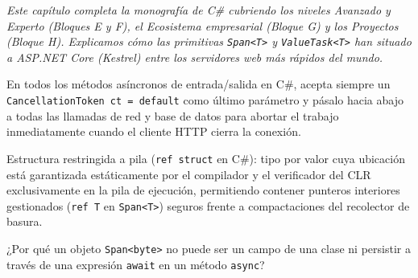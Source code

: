 \documentclass{book}
\begin{document}
\noindent\textit{Este capítulo completa la monografía de C\# cubriendo los niveles Avanzado y Experto (Bloques E y F), el Ecosistema empresarial (Bloque G) y los Proyectos (Bloque H). Explicamos cómo las primitivas \texttt{Span<T>} y \texttt{ValueTask<T>} han situado a ASP.NET Core (Kestrel) entre los servidores web más rápidos del mundo.}

\begin{tcolorbox}[title={Consejo}, studiumtip, breakable]

En todos los métodos asíncronos de entrada/salida en C\#, acepta siempre un \texttt{CancellationToken ct = default} como último parámetro y pásalo hacia abajo a todas las llamadas de red y base de datos para abortar el trabajo inmediatamente cuando el cliente HTTP cierra la conexión.
\end{tcolorbox}

\begin{tcolorbox}[title={Definición}, studiumdef, breakable]

Estructura restringida a pila (\texttt{ref struct} en C\#): tipo por valor cuya ubicación está garantizada estáticamente por el compilador y el verificador del CLR exclusivamente en la pila de ejecución, permitiendo contener punteros interiores gestionados (\texttt{ref T} en \texttt{Span<T>}) seguros frente a compactaciones del recolector de basura.
\end{tcolorbox}

\begin{tcolorbox}[title={Autoficha}, studiumcheck, breakable]

¿Por qué un objeto \texttt{Span<byte>} no puede ser un campo de una clase ni persistir a través de una expresión \texttt{await} en un método \texttt{async}?
\end{tcolorbox}
\end{document}
